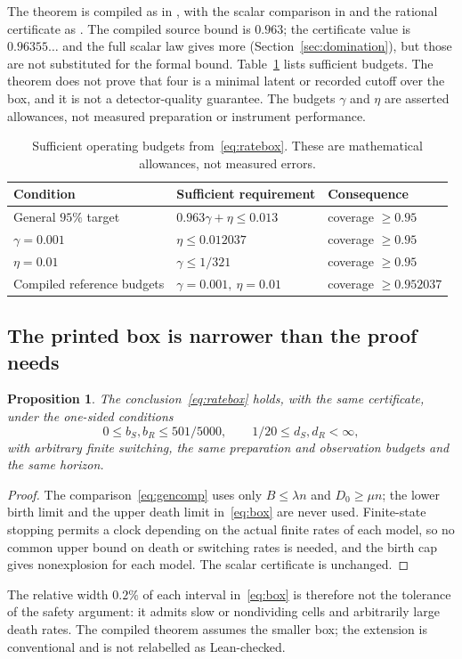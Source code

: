 \documentclass[11pt,a4paper]{article}
\theoremstyle{plain}
\newtheorem{proposition}[theorem]{Proposition}
\theoremstyle{definition}
\theoremstyle{remark}
\begin{document}
The theorem is compiled as  in , with the scalar comparison in  and the rational certificate as . The compiled source bound is $0.963$; the certificate value is $0.96355\ldots$ and the full scalar law gives more (Section~\ref{sec:domination}), but those are not substituted for the formal bound. Table~\ref{tab:budgets} lists sufficient budgets. The theorem does not prove that four is a minimal latent or recorded cutoff over the box, and it is not a detector-quality guarantee. The budgets $\gamma$ and $\eta$ are asserted allowances, not measured preparation or instrument performance.

\begin{table}[t]
\centering
\caption{Sufficient operating budgets from~\eqref{eq:ratebox}. These are mathematical allowances, not measured errors.}\label{tab:budgets}
\begin{tabular}{@{}lll@{}}
\toprule
Condition & Sufficient requirement & Consequence\\
\midrule
General $95\%$ target & $0.963\gamma+\eta\le0.013$ & coverage $\ge0.95$\\
$\gamma=0.001$ & $\eta\le0.012037$ & coverage $\ge0.95$\\
$\eta=0.01$ & $\gamma\le1/321$ & coverage $\ge0.95$\\
Compiled reference budgets & $\gamma=0.001,\ \eta=0.01$ & coverage $\ge0.952037$\\
\bottomrule
\end{tabular}
\end{table}

\subsection{The printed box is narrower than the proof needs}
\begin{proposition}\label{prop:onesided}
The conclusion~\eqref{eq:ratebox} holds, with the same certificate, under the one-sided conditions
\begin{equation}\label{eq:onesided}
0\le b_S,b_R\le501/5000,\qquad 1/20\le d_S,d_R<\infty,
\end{equation}
with arbitrary finite switching, the same preparation and observation budgets and the same horizon.
\end{proposition}
\begin{proof}
The comparison~\eqref{eq:gencomp} uses only $B\le\lambda n$ and $D_0\ge\mu n$; the lower birth limit and the upper death limit in~\eqref{eq:box} are never used. Finite-state stopping permits a clock depending on the actual finite rates of each model, so no common upper bound on death or switching rates is needed, and the birth cap gives nonexplosion for each model. The scalar certificate is unchanged.
\end{proof}
The relative width $0.2\%$ of each interval in~\eqref{eq:box} is therefore not the tolerance of the safety argument: it admits slow or nondividing cells and arbitrarily large death rates. The compiled theorem assumes the smaller box; the extension is conventional and is not relabelled as Lean-checked.
\end{document}
